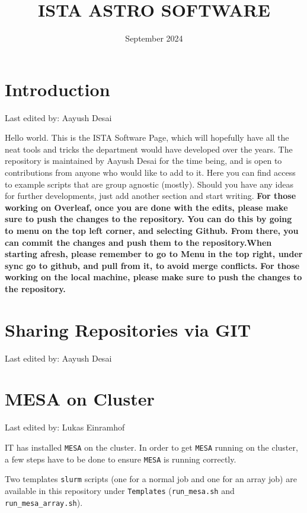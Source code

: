 \documentclass{article}
\title{ISTA ASTRO SOFTWARE}
\date{September 2024}
\newcommand{\setlasteditor}[1]{\gdef\lasteditor{#1}}
\newcommand{\lastedited}{%
    \vspace{1mm} {\footnotesize Last edited by: \lasteditor} \vspace{3mm}
    \newline

}
\begin{document}
\maketitle


\tableofcontents
\newpage
\section*{Introduction}
\setlasteditor{Aayush Desai}
\lastedited
\noindent
Hello world. This is the ISTA Software Page, which will hopefully have all the neat tools and tricks the department would have developed over the years. The repository is maintained by Aayush Desai for the time being, and is open to contributions from anyone who would like to add to it.
\newline
\noindent
Here you can find access to example scripts that are group agnostic (mostly). Should you have any ideas for further developments, just add another section and start writing.
\newline
\newline
\textbf{For those working on Overleaf, once you are done with the edits, please make sure to push the changes to the repository. You can do this by going to menu on the top left corner, and selecting Github. From there, you can commit the changes and push them to the repository.When starting afresh, please remember to go to Menu in the top right, under sync go to github, and pull from it, to avoid merge conflicts.} 
\newline
\newline
\textbf{For those working on the local machine, please make sure to push the changes to the repository.}
\section{Sharing Repositories via GIT}
\setlasteditor{Aayush Desai}
\lastedited

\section{MESA on Cluster}
\setlasteditor{Lukas Einramhof}
\lastedited
IT has installed \texttt{MESA} on the cluster. In order to get \texttt{MESA} running on the cluster, a few steps have to be done to ensure \texttt{MESA} is running correctly.

Two templates \texttt{slurm} scripts (one for a normal job and one for an array job) are available in this repository under \texttt{Templates} (\texttt{run\_mesa.sh} and \texttt{run\_mesa\_array.sh}). \\
\end{document}
